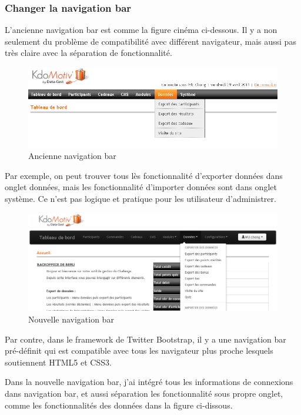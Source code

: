 \subsubsection{Changer la navigation bar}
L'ancienne navigation bar est comme la figure cinéma ci-dessous. Il y a non seulement du problème de compatibilité avec différent navigateur, mais aussi pas très claire avec la séparation de fonctionnalité.
\begin{figure}[hbtp]
\center
\includegraphics[width=15cm]{body/images/navbar-old.png}
\caption{Ancienne navigation bar}
\end{figure}

Par exemple, on peut trouver tous lès fonctionnalité d'exporter données dans onglet données, mais les fonctionnalité d'importer données sont dans onglet système. Ce n'est pas logique et pratique pour les utilisateur d'administrer.



 \begin{figure}[hbtp]
\center
\includegraphics[width=15cm]{body/images/navbar-new.png}
\caption{Nouvelle navigation bar}
\end{figure}

Par contre, dans le framework de Twitter Bootstrap, il y a une navigation bar pré-définit qui est compatible avec tous les navigateur plus proche lesquels soutiennent HTML5 et CSS3.

Dans la nouvelle navigation bar, j'ai intégré tous les informations de connexions dans navigation bar, et aussi séparation les fonctionnalité sous propre onglet, comme les fonctionnalités des données dans la figure ci-dissous. 


